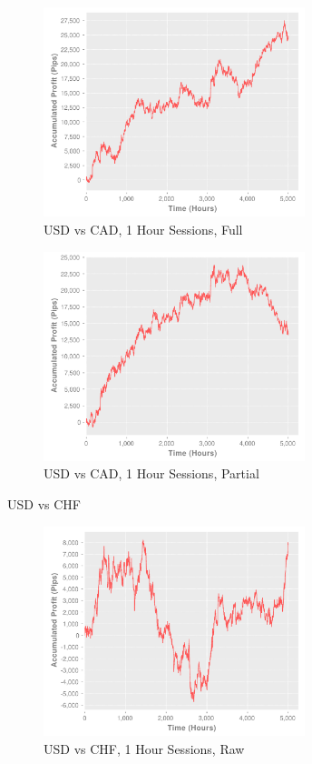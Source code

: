 \documentclass[letterpaper]{article}
\begin{document}
\begin{figure}[!t]
  \centering
  \includegraphics[width=3.0in]{usdcad60-of}
  \caption{USD vs CAD, 1 Hour Sessions, Full}
  \label{usdcad60-of}
\end{figure}

\begin{figure}[!t]
  \centering
  \includegraphics[width=3.0in]{usdcad60-op}
  \caption{USD vs CAD, 1 Hour Sessions, Partial}
  \label{usdcad60-op}
\end{figure}

USD vs CHF

\begin{figure}[!t]
  \centering
  \includegraphics[width=3.0in]{usdchf60-r}
  \caption{USD vs CHF, 1 Hour Sessions, Raw}
  \label{usdchf60-r}
\end{figure}
\end{document}

